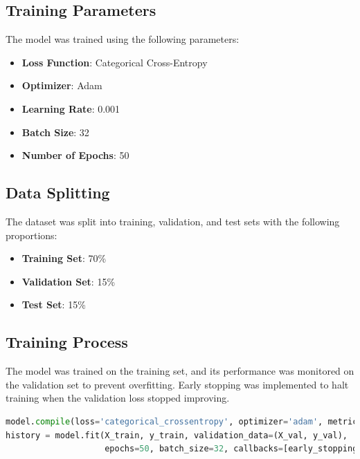 \documentclass[12pt]{article}
\begin{document}
\subsection{Training Parameters}

The model was trained using the following parameters:

\begin{itemize}
    \item \textbf{Loss Function}: Categorical Cross-Entropy
    \item \textbf{Optimizer}: Adam
    \item \textbf{Learning Rate}: 0.001
    \item \textbf{Batch Size}: 32
    \item \textbf{Number of Epochs}: 50
\end{itemize}

\subsection{Data Splitting}

The dataset was split into training, validation, and test sets with the following proportions:

\begin{itemize}
    \item \textbf{Training Set}: 70\%
    \item \textbf{Validation Set}: 15\%
    \item \textbf{Test Set}: 15\%
\end{itemize}

\subsection{Training Process}

The model was trained on the training set, and its performance was monitored on the validation set to prevent overfitting. Early stopping was implemented to halt training when the validation loss stopped improving.

\begin{lstlisting}[language=Python, caption=Model Training]
model.compile(loss='categorical_crossentropy', optimizer='adam', metrics=['accuracy'])
history = model.fit(X_train, y_train, validation_data=(X_val, y_val),
                    epochs=50, batch_size=32, callbacks=[early_stopping])
\end{lstlisting}

\newpage
\end{document}
